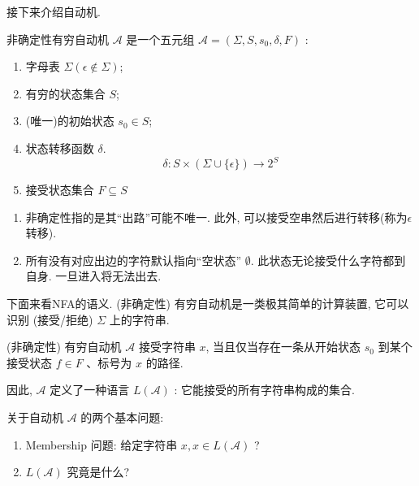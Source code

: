 \documentclass{ctexart}
\begin{document}
    接下来介绍自动机. 

    \begin{definition}[NFA]
        非确定性有穷自动机 $\mathcal{A}$ 是一个五元组 $\mathcal{A}=\left(\Sigma, S, s_0, \delta, F\right)$ :
        \begin{enumerate}
            \item 字母表 $\Sigma(\epsilon \notin \Sigma)$;
            \item 有穷的状态集合 $S$;
            \item (唯一)的初始状态 $s_0 \in S$;
            \item 状态转移函数 $\delta$.$$
            \delta: S \times(\Sigma \cup\{\epsilon\}) \rightarrow 2^S
            $$
            \item 接受状态集合 $F \subseteq S$
        \end{enumerate}

    \end{definition}

    \begin{remark}
        \begin{enumerate}
            \item 非确定性指的是其``出路''可能不唯一. 此外, 可以接受空串然后进行转移(称为$\epsilon$转移). 
            \item 所有没有对应出边的字符默认指向“空状态” $\emptyset$. 此状态无论接受什么字符都到自身. 一旦进入将无法出去.
        \end{enumerate}
    \end{remark}

    下面来看NFA的语义. (非确定性) 有穷自动机是一类极其简单的计算装置, 它可以识别 (接受/拒绝) $\Sigma$ 上的字符串. 

    \begin{definition}[接受(Accept)]
        (非确定性) 有穷自动机 $\mathcal{A}$ 接受字符串 $x$, 当且仅当存在一条从开始状态 $s_0$ 到某个接受状态 $f \in F$ 、标号为 $x$ 的路径.
    \end{definition}

    因此, $\mathcal{A}$ 定义了一种语言 $L(\mathcal{A})$ : 它能接受的所有字符串构成的集合.

    关于自动机 $\mathcal{A}$ 的两个基本问题:
    \begin{enumerate}
        \item Membership 问题: 给定字符串 $x, x \in L(\mathcal{A})$ ?
        \item $L(\mathcal{A})$ 究竟是什么?
    \end{enumerate}
\end{document}
